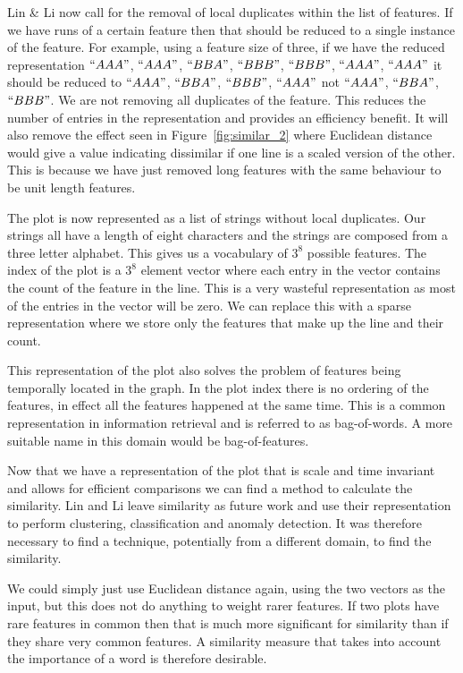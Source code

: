 Lin \& Li now call for the removal of local duplicates within the list of features.  If we have runs of a certain feature then that should be reduced to a single instance of the feature.  For example, using a feature size of three, if we have the reduced representation $``AAA"$, $``AAA"$, $``BBA"$, $``BBB"$, $``BBB"$, $``AAA"$, $``AAA"$ it should be reduced to $``AAA"$, $``BBA"$, $``BBB"$, $``AAA"$ not $``AAA"$, $``BBA"$, $``BBB"$.  We are not removing all duplicates of the feature.  This reduces the number of entries in the representation and provides an efficiency benefit.  It will also remove the effect seen in Figure~\ref{fig:similar_2} where Euclidean distance would give a value indicating dissimilar if one line is a scaled version of the other.  This is because we have just removed long features with the same behaviour to be unit length features.

The plot is now represented as a list of strings without local duplicates.  Our strings all have a length of eight characters and the strings are composed from a three letter alphabet.  This gives us a vocabulary of $3^8$ possible features.  The index of the plot is a $3^8$ element vector where each entry in the vector contains the count of the feature in the line.  This is a very wasteful representation as most of the entries in the vector will be zero.  We can replace this with a sparse representation where we store only the features that make up the line and their count.

This representation of the plot also solves the problem of features being temporally located in the graph.  In the plot index there is no ordering of the features, in effect all the features happened at the same time.  This is a common representation in information retrieval and is referred to as bag-of-words.  A more suitable name in this domain would be bag-of-features.

Now that we have a representation of the plot that is scale and time invariant and allows for efficient comparisons we can find a method to calculate the similarity.  Lin and Li leave similarity as future work and use their representation to perform clustering, classification and anomaly detection.  It was therefore necessary to find a technique, potentially from a different domain, to find the similarity.

We could simply just use Euclidean distance again, using the two vectors as the input, but this does not do anything to weight rarer features.  If two plots have rare features in common then that is much more significant for similarity than if they share very common features.  A similarity measure that takes into account the importance of a word is therefore desirable.

